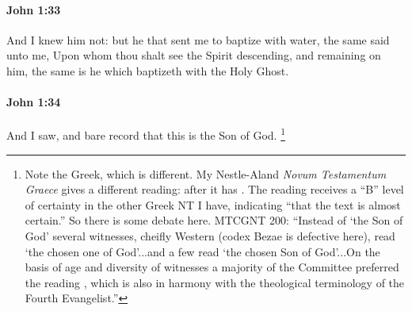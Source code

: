 		\paragraph{John 1:33} %
			\label{JOHN-1-33}

			And I knew him not: but he that sent me to baptize with water, the same said unto me, Upon whom thou shalt see the Spirit descending, and remaining on him, the same is he which baptizeth with the Holy Ghost.

			\begin{framed}
			\scriptsize
				\begin{compactdesc}
					\item[SBLG] 
				\end{compactdesc}
			\end{framed}

		\paragraph{John 1:34} %
			\label{JOHN-1-34}

			And I saw, and bare record that this is the Son of God.%
				\footnote{%
					Note the Greek, which is different. My Nestle-Aland \textit{Novum Testamentum Graece} gives a different reading: after  it has \gr{ὁ υἱὸς τοῦ θεοῦ}. The  reading receives a ``B'' level of certainty in the other Greek NT I have, indicating ``that the text is almost certain.'' So there is some debate here. MTCGNT 200: ``Instead of `the Son of God' several witnesses, cheifly Western (codex Bezae is defective here), read `the chosen one of God'...and a few read `the chosen Son of God'...On the basis of age and diversity of witnesses a majority of the Committee preferred the reading , which is also in harmony with the theological terminology of the Fourth Evangelist.''
					}

